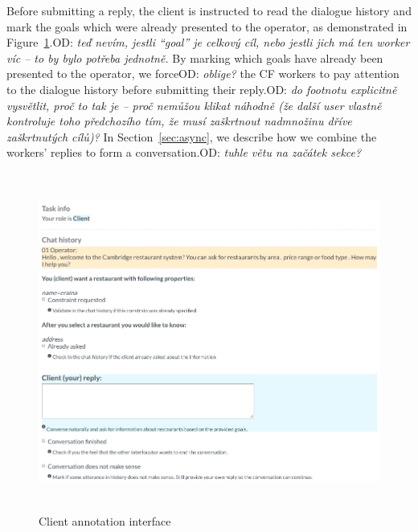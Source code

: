 \documentclass[runningheads,a4paper]{llncs}
\def\OD#1{{\color{darkgreen}OD: \it #1}}
\begin{document}
Before submitting a reply, the client is instructed to read the dialogue history and mark the goals which were already presented to the operator, as demonstrated in Figure~\ref{fig:client}.\OD{teď nevím, jestli “goal” je celkový cíl, nebo jestli jich má ten worker víc -- to by bylo potřeba jednotně.}
By marking which goals have already been presented to the operator, we force\OD{oblige?} the CF workers to pay attention to the dialogue history before submitting their reply.\OD{do footnotu explicitně vysvětlit, proč to tak je -- proč nemůžou klikat náhodně (že další user vlastně kontroluje toho předchozího tím, že musí zaškrtnout nadmnožinu dříve zaškrtnutých cílů)?}
In Section~\ref{sec:async}, we describe how we combine the workers' replies to form a conversation.\OD{tuhle větu na začátek sekce?}

\begin{figure}[tb] %
\vspace{-1.00em}
\begin{center}
\includegraphics[height=30em]{gui-annotators-client}
\caption{Client annotation interface}
\end{center}
\vspace{-1.00em}
\label{fig:client}
\end{figure}
\vspace{-1.00em}

\vspace{-1.00em}
\end{document}
